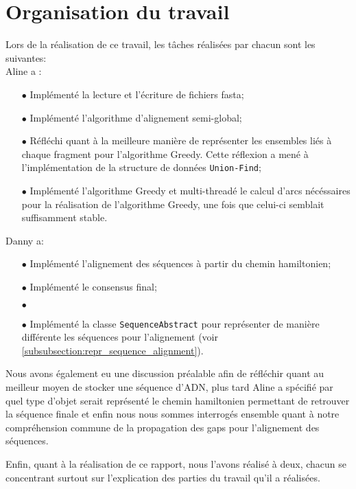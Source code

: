 \section{Organisation du travail}

Lors de la réalisation de ce travail, les tâches réalisées par chacun sont les suivantes:\\
Aline a :
\begin{itemize}
	\item[$\bullet$]Implémenté la lecture et l'écriture de fichiers fasta;
	\item[$\bullet$]Implémenté l'algorithme d'alignement semi-global;
	\item[$\bullet$]Réfléchi quant à la meilleure manière de représenter les ensembles liés à chaque fragment pour l'algorithme Greedy.
	 Cette réflexion a mené à l'implémentation de la structure de données \verb|Union-Find|;
	\item[$\bullet$]Implémenté l'algorithme Greedy et multi-threadé le calcul d'arcs nécéssaires pour la réalisation de l'algorithme Greedy, une fois que celui-ci semblait suffisamment stable.
\end{itemize}
$ $\\
Danny a:
\begin{itemize}
	\item[$\bullet$] Implémenté l'alignement des séquences à partir du chemin hamiltonien;
	\item[$\bullet$] Implémenté le consensus final;
	\item[$\bullet$] %
	\item[$\bullet$] Implémenté la classe \verb|SequenceAbstract| pour
		représenter de manière différente les séquences pour l'alignement
		(voir \ref{subsubsection:repr_sequence_alignment}).
\end{itemize}

Nous avons également eu une discussion préalable afin de réfléchir quant au meilleur moyen de stocker une séquence d'ADN, plus tard Aline a spécifié par quel type d'objet serait représenté le chemin hamiltonien permettant de retrouver la séquence finale et enfin nous nous sommes interrogés ensemble quant à notre compréhension commune de la propagation des gaps pour l'alignement des séquences.
\begin{comment}
De plus, Aline ayant également réfléchi à la manière d'obtenir la séquence finale à partir du chemin hamiltonien donné par l'algorithme greedy avant que Danny ne propose sa propre solution, elle a également exposé son point de vue quant à la réalisation de cette dernière étape. Le temps lui ayant manqué, son algorithme n'est pas totalement abouti et nous avons donc continué de travailler à partir de celui de Danny.
\end{comment}

Enfin, quant à la réalisation de ce rapport, nous l'avons réalisé à deux, chacun
se concentrant surtout sur l'explication des parties du travail qu'il a
réalisées.

